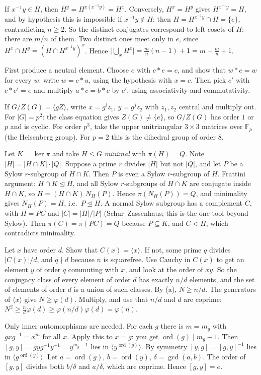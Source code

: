 \documentclass[11pt,a4paper]{article}
\begin{document}
 If $x^{-1}y\in H$, then $H^y=H^{x(x^{-1}y)}=H^x$. Conversely, $H^x=H^y$ gives $H^{x^{-1}y}=H$, and by hypothesis this is impossible if $x^{-1}y\notin H$: then $H=H^{x^{-1}y}\cap H=\{e\}$, contradicting $n\ge2$.
 So the distinct conjugates correspond to left cosets of $H$: there are $m/n$ of them. Two distinct ones meet only in $e$, since $H^x\cap H^y=(H\cap H^{x^{-1}y})^x$.
 Hence $\bigl|\bigcup_x H^x\bigr|=\frac mn(n-1)+1=m-\frac mn+1$.

 First produce a neutral element. Choose $e$ with $c*e=c$, and show that $w*e=w$ for every $w$: write $w=c*u$, using the hypothesis with $x=c$.
 Then pick $c'$ with $c*c'=e$ and multiply $a*c=b*c$ by $c'$, using associativity and commutativity.

 If $G/Z(G)=\langle gZ\rangle$, write $x=g^iz_1$, $y=g^jz_2$ with $z_1,z_2$ central and multiply out.
 For $|G|=p^2$: the class equation gives $Z(G)\ne\{e\}$, so $G/Z(G)$ has order $1$ or $p$ and is cyclic.
 For order $p^3$, take the upper unitriangular $3\times3$ matrices over $\mathbb F_p$ (the Heisenberg group). For $p=2$ this is the dihedral group of order $8$.

 Let $K=\ker\pi$ and take $H\le G$ \emph{minimal} with $\pi(H)=Q$. Note $|H|=|H\cap K|\cdot|Q|$. Suppose a prime $r$ divides $|H|$ but not $|Q|$, and let $P$ be a Sylow $r$-subgroup of $H\cap K$. Then $P$ is even a Sylow $r$-subgroup of $H$.
 Frattini argument: $H\cap K\trianglelefteq H$, and all Sylow $r$-subgroups of $H\cap K$ are conjugate inside $H\cap K$, so $H=(H\cap K)\,N_H(P)$. Hence $\pi(N_H(P))=Q$, and minimality gives $N_H(P)=H$, i.e.\ $P\trianglelefteq H$.
 A normal Sylow subgroup has a complement $C$, with $H=PC$ and $|C|=|H|/|P|$ (Schur--Zassenhaus; this is the one tool beyond Sylow). Then $\pi(C)=\pi(PC)=Q$ because $P\subseteq K$, and $C<H$, which contradicts minimality.

 Let $x$ have order $d$. Show that $C(x)=\langle x\rangle$. If not, some prime $q$ divides $|C(x)|/d$, and $q\nmid d$ because $n$ is squarefree. Use Cauchy in $C(x)$ to get an element $y$ of order $q$ commuting with $x$, and look at the order of $xy$.
 So the conjugacy class of every element of order $d$ has exactly $n/d$ elements, and the set of elements of order $d$ is a union of such classes.
 By (a), $N\ge n/d$. The generators of $\langle x\rangle$ give $N\ge\varphi(d)$. Multiply, and use that $n/d$ and $d$ are coprime: $N^2\ge \frac nd\varphi(d)\ge\varphi(n/d)\varphi(d)=\varphi(n)$.

 Only inner automorphisms are needed. For each $g$ there is $m=m_g$ with $gxg^{-1}=x^{m}$ for all $x$. Apply this to $x=g$: you get $\operatorname{ord}(g)\mid m_g-1$.
 Then $[g,y]=gyg^{-1}y^{-1}=y^{m_g-1}$ lies in $\langle y^{\operatorname{ord}(g)}\rangle$. By symmetry $[y,g]=[g,y]^{-1}$ lies in $\langle g^{\operatorname{ord}(y)}\rangle$.
 Let $a=\operatorname{ord}(g)$, $b=\operatorname{ord}(y)$, $\delta=\gcd(a,b)$. The order of $[g,y]$ divides both $b/\delta$ and $a/\delta$, which are coprime. Hence $[g,y]=e$.
\end{document}
